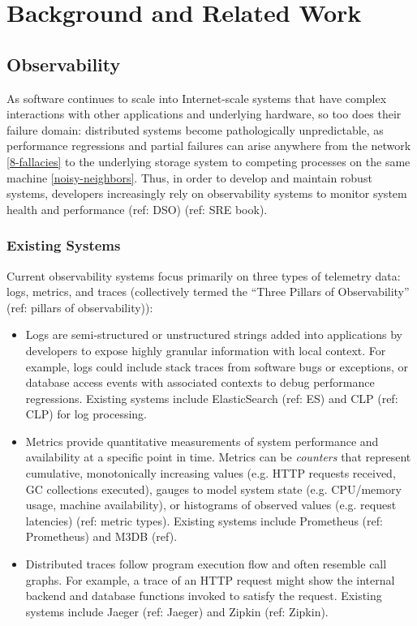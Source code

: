 \section{Background and Related Work}

\subsection{Observability}

As software continues to scale into Internet-scale systems that have complex interactions with other
applications and underlying hardware, so too does their failure domain: distributed systems become
pathologically unpredictable, as performance regressions and partial failures can arise anywhere
from the network \ref{8-fallacies} to the underlying storage system to competing
processes on the same machine \ref{noisy-neighbors}. Thus, in order to develop and maintain robust
systems, developers increasingly rely on observability systems to monitor system health and
performance (ref: DSO) (ref: SRE book).

\subsubsection{Existing Systems}

Current observability systems focus primarily on three types of telemetry data: logs, metrics, and
traces (collectively termed the ``Three Pillars of Observability'' (ref: pillars of observability)):

\begin{itemize}
    \item Logs are semi-structured or unstructured strings added into applications by developers to
        expose highly granular information with local context. For example, logs could include stack
        traces from software bugs or exceptions, or database access events with associated contexts
        to debug performance regressions. Existing systems include ElasticSearch (ref: ES) and CLP
        (ref: CLP) for log processing.
    \item Metrics provide quantitative measurements of system performance and availability at a
        specific point in time. Metrics can be \textit{counters} that represent cumulative,
        monotonically increasing values (e.g. HTTP requests received, GC collections executed),
        gauges to model system state (e.g. CPU/memory usage, machine availability), or histograms of
        observed values (e.g. request latencies) (ref: metric types). Existing systems include
        Prometheus (ref: Prometheus) and M3DB (ref).
    \item Distributed traces follow program execution flow and often resemble call graphs. For
        example, a trace of an HTTP request might show the internal backend and database functions
        invoked to satisfy the request. Existing systems include Jaeger (ref: Jaeger) and Zipkin
        (ref: Zipkin).
\end{itemize}


